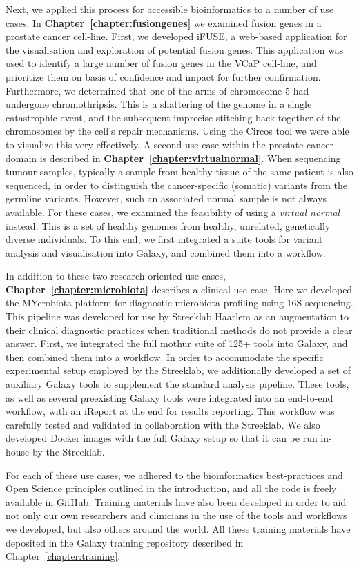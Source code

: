 Next, we applied this process for accessible bioinformatics to a number of use cases. In \textbf{Chapter~\ref{chapter:fusiongenes}} we examined fusion genes in a prostate cancer cell-line. First, we developed iFUSE, a web-based application for the visualisation and exploration of potential fusion genes. This application was used to identify a large number of fusion genes in the VCaP cell-line, and prioritize them on basis of confidence and impact for further confirmation. Furthermore, we determined that one of the arms of chromosome 5 had undergone chromothripsis. This is a shattering of the genome in a single catastrophic event, and the subsequent imprecise stitching back together of the chromosomes by the cell's repair mechanisms. Using the Circos tool we were able to visualize this very effectively.
A second use case within the prostate cancer domain is described in \textbf{Chapter~\ref{chapter:virtualnormal}}. When sequencing tumour samples, typically a sample from healthy tissue of the same patient is also sequenced, in order to distinguish the cancer-specific (somatic) variants from the germline variants. However, such an associated normal sample is not always available. For these cases, we examined the feasibility of using a \emph{virtual normal} instead. This is a set of healthy genomes from healthy, unrelated, genetically diverse individuals. To this end, we first integrated a suite tools for variant analysis and visualisation into Galaxy, and combined them into a workflow.

In addition to these two research-oriented use cases, \textbf{Chapter~\ref{chapter:microbiota}} describes a clinical use case. Here we developed the MYcrobiota platform for diagnostic microbiota profiling using 16S sequencing. This pipeline was developed for use by Streeklab Haarlem as an augmentation to their clinical diagnostic practices when traditional methods do not provide a clear answer.
First, we integrated the full mothur suite of 125+ tools into Galaxy, and then combined them into a workflow. In order to accommodate the specific experimental setup employed by the Streeklab, we additionally developed a set of auxiliary Galaxy tools to supplement the standard analysis pipeline.
These tools, as well as several preexisting Galaxy tools were integrated into an end-to-end workflow, with an iReport at the end for results reporting. This workflow was carefully tested and validated in collaboration with the Streeklab. We also developed Docker images with the full Galaxy setup so that it can be run in-house by the Streeklab.

For each of these use cases, we adhered to the bioinformatics best-practices and Open Science principles outlined in the introduction, and all the code is freely available in GitHub. Training materials have also been developed in order to aid not only our own researchers and clinicians in the use of the tools and workflows we developed, but also others around the world. All these training materials have deposited in the Galaxy training repository described in Chapter~\ref{chapter:training}.


